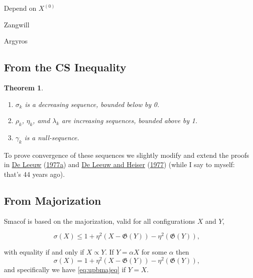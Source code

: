 \documentclass[
  12pt,
]{book}
\newtheorem{theorem}{Theorem}[chapter]
\theoremstyle{definition}
\theoremstyle{definition}
\theoremstyle{definition}
\theoremstyle{definition}
\theoremstyle{remark}
\begin{document}
Depend on \(X^{(0)}\)

Zangwill

Argyros

\hypertarget{from-the-cs-inequality}{%
\subsection{From the CS Inequality}\label{from-the-cs-inequality}}

\begin{theorem}
\protect\hypertarget{thm:smacoffunc}{}{\label{thm:smacoffunc} }~

\begin{enumerate}
\def\labelenumi{\arabic{enumi}.}
\item
  \(\sigma_k\) is a decreasing sequence, bounded below by 0.
\item
  \(\rho_k\), \(\eta_k\), amd \(\lambda_k\) are increasing sequences, bounded above by 1.
\item
  \(\gamma_k\) is a null-sequence.
\end{enumerate}
\end{theorem}

To prove convergence of these sequences we slightly modify and extend the proofs in \protect\hyperlink{ref-deleeuw_C_77}{De Leeuw} (\protect\hyperlink{ref-deleeuw_C_77}{1977a}) and \protect\hyperlink{ref-deleeuw_heiser_C_77}{De Leeuw and Heiser} (\protect\hyperlink{ref-deleeuw_heiser_C_77}{1977}) (while I say to myself: that's 44 years ago).

\hypertarget{from-majorization}{%
\subsection{From Majorization}\label{from-majorization}}

Smacof is based on the majorization, valid for all configurations \(X\) and \(Y\),

\begin{equation}
\sigma(X)\leq 1+\eta^2(X-\mathfrak{G}(Y))-\eta^2(\mathfrak{G}(Y)),
\label{eq:upbmajineq}
\end{equation}

with equality if and only if \(X\propto Y\). If \(Y=\alpha X\) for some \(\alpha\) then
\begin{equation}
\sigma(X)=1+\eta^2(X-\mathfrak{G}(Y))-\eta^2(\mathfrak{G}(Y)),
\label{eq:upbmajeq}
\end{equation}
and specifically we have \eqref{eq:upbmajeq} if \(Y=X\).
\end{document}

